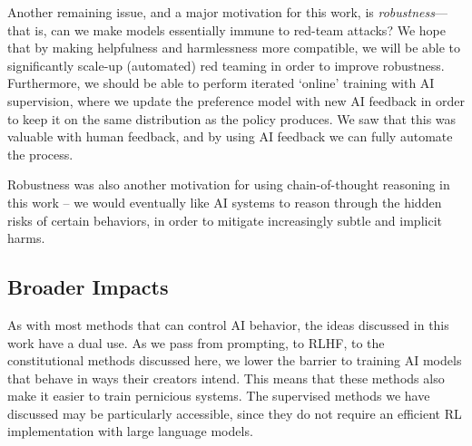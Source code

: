 \documentclass[english]{article}
\renewcommand\>{\rangle}
\begin{document}
Another remaining issue, and a major motivation for this work, is {\it robustness}---that is, can we make models essentially immune to red-team attacks?  We hope that by making helpfulness and harmlessness more compatible, we will be able to significantly scale-up (automated) red teaming in order to improve robustness.  Furthermore, we should be able to perform iterated `online' training \cite{bai2022training} with AI supervision, where we update the preference model with new AI feedback in order to keep it on the same distribution as the policy produces.  We saw that this  was valuable with human feedback, and by using AI feedback we can fully automate the process.

Robustness was also another motivation for using chain-of-thought reasoning in this work -- we would eventually like AI systems to reason through the hidden risks of certain behaviors, in order to mitigate increasingly subtle and implicit harms.  
    



\subsection{Broader Impacts}

As with most methods that can control AI behavior, the ideas discussed in this work have a dual use.  As we pass from prompting, to RLHF, to the constitutional methods discussed here, we lower the barrier to training AI models that behave in ways their creators intend.  This means that these methods also make it easier to train pernicious systems.  The supervised methods we have discussed may be particularly accessible, since they do not require an efficient RL implementation with large language models.
\end{document}
